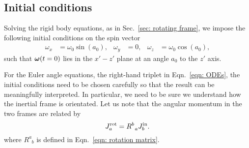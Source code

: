 \documentclass[../full_thesis/full_thesis.tex]{subfiles}
\begin{document}
\subsection{Initial conditions}
\label{sec: initial conditions}

Solving the rigid body equations, as in Sec.~\ref{sec:
rotating frame}, we impose the following initial conditions on the
spin vector
\begin{align}
\omega_{x} & = \omega_{0}\sin(a_{0}), &
\omega_{y} & = 0, &
\omega_{z} & = \omega_{0}\cos(a_{0}),
\label{eqn: spin init}
\end{align}
such that $\boldsymbol{\omega}(t=0)$ lies in the $x' - z'$ plane at an angle $a_{0}$ to the
$z'$ axis.

For the Euler angle equations, the right-hand triplet in Eqn.~\eqref{eqn:
ODEs}, the initial conditions need to be chosen carefully so that the result
can be meaningfully interpreted. In particular, we need to be sure we understand
how the inertial frame is orientated. Let us note that the angular
momentum in the two frames are related by
\begin{equation}
J^{\textrm{rot}}_a = R^{b}_{\;\;a} J^{\textrm{in}}_b .
\label{eqn: transform}
\end{equation}
where $R^{a}_{\;\;b}$ is defined in Eqn.~\eqref{eqn: rotation matrix}.
\end{document}
